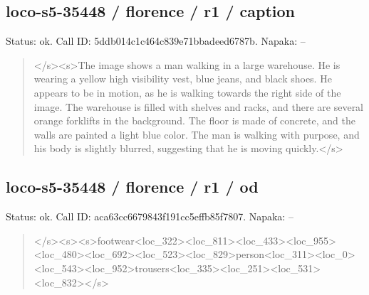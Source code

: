 \documentclass[10pt,a4paper]{article}
\begin{document}
\subsection*{loco-s5-35448 / florence / r1 / caption}
Status: ok. Call ID: 5ddb014c1c464c839e71bbadeed6787b. Napaka: --
\begin{quote}\footnotesize
</s>\allowbreak{}<s>\allowbreak{}The image shows a man walking in a large warehouse. He is wearing a yellow high visibility vest,\allowbreak{} blue jeans,\allowbreak{} and black shoes. He appears to be in motion,\allowbreak{} as he is walking towards the right side of the image. The warehouse is filled with shelves and racks,\allowbreak{} and there are several orange forklifts in the background. The floor is made of concrete,\allowbreak{} and the walls are painted a light blue color. The man is walking with purpose,\allowbreak{} and his body is slightly blurred,\allowbreak{} suggesting that he is moving quickly.</s>\allowbreak{}
\end{quote}
\subsection*{loco-s5-35448 / florence / r1 / od}
Status: ok. Call ID: aca63cc6679843f191cc5effb85f7807. Napaka: --
\begin{quote}\footnotesize
</s>\allowbreak{}<s>\allowbreak{}<s>\allowbreak{}footwear<loc\_322>\allowbreak{}<loc\_\allowbreak{}811>\allowbreak{}<loc\_433>\allowbreak{}<loc\_955>\allowbreak{}<loc\_480>\allowbreak{}<\allowbreak{}loc\_692>\allowbreak{}<loc\_523>\allowbreak{}<loc\_829>\allowbreak{}person\allowbreak{}<loc\_311>\allowbreak{}<loc\_0>\allowbreak{}<loc\_543>\allowbreak{}<loc\_95\allowbreak{}2>\allowbreak{}trousers<loc\_335>\allowbreak{}<loc\_251>\allowbreak{}<loc\allowbreak{}\_531>\allowbreak{}<loc\_832>\allowbreak{}</s>\allowbreak{}
\end{quote}
\end{document}

